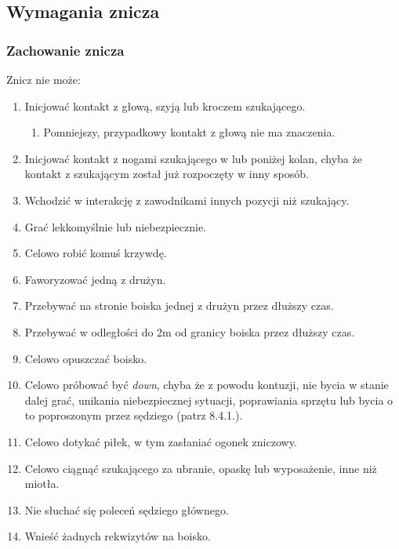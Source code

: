 \documentclass[11pt,a4paper]{article}
\begin{document}
\subsection{Wymagania znicza}

\subsubsection{Zachowanie znicza}
Znicz nie może:
\begin{enumerate}
  \item Inicjować kontakt z głową, szyją lub kroczem szukającego.
  \begin{enumerate}
    \item Pomniejszy, przypadkowy kontakt z głową nie ma znaczenia.
  \end{enumerate}
  \item Inicjować kontakt z nogami szukającego w lub poniżej kolan, chyba że kontakt z szukającym został już rozpoczęty w inny sposób.
  \item Wchodzić w interakcję z zawodnikami innych pozycji niż szukający.
  \item Grać lekkomyślnie lub niebezpiecznie.
  \item Celowo robić komuś krzywdę.
  \item Faworyzować jedną z drużyn.
  \item Przebywać na stronie boiska jednej z drużyn przez dłuższy czas.
  \item Przebywać w odległości do 2m od granicy boiska przez dłuższy czas.
  \item Celowo opuszczać boisko.
  \item Celowo próbować być \emph{down}, chyba że z powodu kontuzji, nie bycia w stanie dalej grać, unikania niebezpiecznej sytuacji, poprawiania sprzętu lub bycia o to poproszonym przez sędziego (patrz 8.4.1.). %
  \item Celowo dotykać piłek, w tym zasłaniać ogonek zniczowy.
  \item Celowo ciągnąć szukającego za ubranie, opaskę lub wyposażenie, inne niż miotła.
  \item Nie słuchać się poleceń sędziego głównego.
  \item Wnieść żadnych rekwizytów na boisko.
\end{enumerate}
\end{document}
